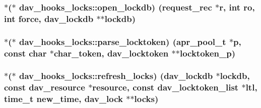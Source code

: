 \subsubsection[{\texorpdfstring{open\+\_\+lockdb}{open_lockdb}}]{$\ast$($\ast$ dav\+\_\+hooks\+\_\+locks\+::open\+\_\+lockdb) ({\bf request\+\_\+rec} $\ast${\bf r}, {\bf int} {\bf ro}, {\bf int} force, {\bf dav\+\_\+lockdb} $\ast$$\ast${\bf lockdb})}\hypertarget{structdav__hooks__locks_a84b994d542610dace4ae1fe42126d65a}{}\label{structdav__hooks__locks_a84b994d542610dace4ae1fe42126d65a}
\subsubsection[{\texorpdfstring{parse\+\_\+locktoken}{parse_locktoken}}]{$\ast$($\ast$ dav\+\_\+hooks\+\_\+locks\+::parse\+\_\+locktoken) ({\bf apr\+\_\+pool\+\_\+t} $\ast${\bf p}, const char $\ast$char\+\_\+token, {\bf dav\+\_\+locktoken} $\ast$$\ast$locktoken\+\_\+p)}\hypertarget{structdav__hooks__locks_ae4fdf6c8c501bd174ccc40f5fdd0a0f4}{}\label{structdav__hooks__locks_ae4fdf6c8c501bd174ccc40f5fdd0a0f4}
\subsubsection[{\texorpdfstring{refresh\+\_\+locks}{refresh_locks}}]{$\ast$($\ast$ dav\+\_\+hooks\+\_\+locks\+::refresh\+\_\+locks) ({\bf dav\+\_\+lockdb} $\ast${\bf lockdb}, const {\bf dav\+\_\+resource} $\ast${\bf resource}, const {\bf dav\+\_\+locktoken\+\_\+list} $\ast${\bf ltl}, time\+\_\+t new\+\_\+time, {\bf dav\+\_\+lock} $\ast$$\ast${\bf locks})}\hypertarget{structdav__hooks__locks_ad9a97186456fe5702a159d5d6577c31a}{}\label{structdav__hooks__locks_ad9a97186456fe5702a159d5d6577c31a}
